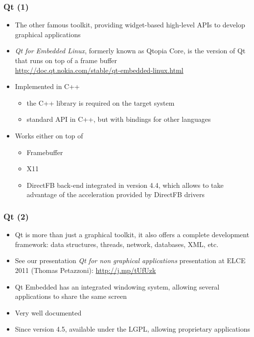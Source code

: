 \begin{frame}
  \frametitle{Qt (1)}
  \begin{itemize}
  \item The other famous toolkit, providing widget-based high-level APIs to
    develop graphical applications
  \item {\em Qt for Embedded Linux}, formerly known as Qtopia Core, is
    the version of Qt that runs on top of a frame buffer\\
    \url{http://doc.qt.nokia.com/stable/qt-embedded-linux.html}
  \item Implemented in C++
    \begin{itemize}
    \item the C++ library is required on the target system
    \item standard API in C++, but with bindings for other languages
    \end{itemize}
  \item Works either on top of
    \begin{itemize}
    \item Framebuffer
    \item X11
    \item DirectFB back-end integrated in version 4.4, which allows to take
      advantage of the acceleration provided by DirectFB drivers
    \end{itemize}
  \end{itemize}
\end{frame}

\begin{frame}
  \frametitle{Qt (2)}
  \begin{itemize}
  \item Qt is more than just a graphical toolkit, it also offers a
    complete development framework: data structures, threads, network,
    databases, XML, etc.
  \item See our presentation {\em Qt for non graphical applications}
    presentation at ELCE 2011 (Thomas Petazzoni):
    \url{http://j.mp/tUfUzk}
  \item Qt Embedded has an integrated windowing system, allowing
    several applications to share the same screen
  \item Very well documented
  \item Since version 4.5, available under the LGPL, allowing
    proprietary applications
  \end{itemize}
\end{frame}

